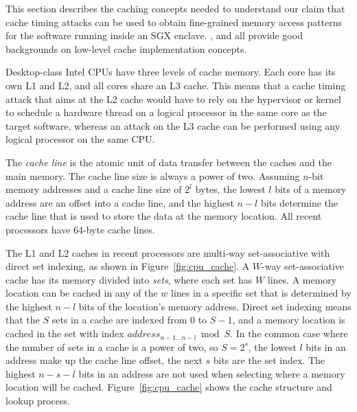 This section describes the caching concepts needed to understand our claim that
cache timing attacks can be used to obtain fine-grained memory access patterns
for the software running inside an SGX enclave. \cite{smith1982cache},
\cite{patterson2013architecture} and \cite{hennessy2012architecture} all
provide good backgrounds on low-level cache implementation concepts.

Desktop-class Intel CPUs have three levels of cache memory. Each core has its
own L1 and L2, and all cores share an L3 cache. This means that a cache timing
attack that aims at the L2 cache would have to rely on the hypervisor or kernel
to schedule a hardware thread on a logical processor in the same core as the
target software, whereas an attack on the L3 cache can be performed using any
logical processor on the same CPU.

The \textit{cache line} is the atomic unit of data transfer between the caches
and the main memory. The cache line size is always a power of two. Assuming
$n$-bit memory addresses and a cache line size of $2^{l}$ bytes, the lowest
$l$ bits of a memory address are an offset into a cache line, and the highest
$n - l$ bits determine the cache line that is used to store the data at the
memory location. All recent processors have 64-byte cache lines.

The L1 and L2 caches in recent processors are multi-way set-associative with
direct set indexing, as shown in Figure~\ref{fig:cpu_cache}. A $W$-way
set-associative cache has its memory divided into \textit{sets}, where each set
has $W$ lines. A memory location can be cached in any of the $w$ lines in a
specific set that is determined by the highest $n - l$ bits of the location's
memory address. Direct set indexing means that the $S$ sets in a cache are
indexed from $0$ to $S - 1$, and a memory location is cached in the set with
index $address_{n - 1 \ldots n - l} \bmod S$. In the common case where the
number of sets in a cache is a power of two, so $S = 2^{s}$, the lowest $l$
bits in an address make up the cache line offset, the next $s$ bits are the set
index. The highest $n - s - l$ bits in an address are not used when selecting
where a memory location will be cached. Figure~\ref{fig:cpu_cache} shows the
cache structure and lookup process.

